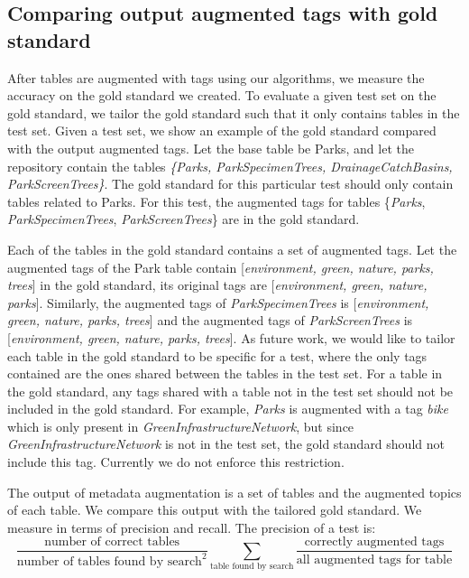 \subsection{Comparing output augmented tags with gold standard}
\label{ssec:ComparingOutputAugmentedTagsWithGoldStandard}

After tables are augmented with tags using our algorithms, we measure the accuracy on the gold standard we created. To evaluate a given test set on the gold standard, we tailor the gold standard such that it only contains tables in the test set. Given a test set, we show an example of the gold standard compared with the output augmented tags. Let the base table be Parks, and let the repository contain the tables  \textit{\{Parks, ParkSpecimenTrees, DrainageCatchBasins, ParkScreenTrees\}}. The gold standard for this particular test should only contain tables related to Parks. For this test, the augmented tags for tables \{\textit{Parks}, \textit{ParkSpecimenTrees}, \textit{ParkScreenTrees}\} are in the gold standard.

Each of the tables in the gold standard contains a set of augmented tags. Let the augmented tags of the Park table contain [\textit{environment, green, nature, parks, trees}] in the gold standard, its original tags are [\textit{environment, green, nature, parks}]. Similarly, the augmented tags of \textit{ParkSpecimenTrees} is [\textit{environment, green, nature, parks, trees}] and the augmented tags of \textit{ParkScreenTrees} is [\textit{environment, green, nature, parks, trees}]. As future work, we would like to tailor each table in the gold standard to be specific for a test, where the only tags contained are the ones shared between the tables in the test set. For a table in the gold standard, any tags shared with a table not in the test set should not be included in the gold standard. For example, \textit{Parks} is augmented with a tag \textit{bike} which is only present in \textit{GreenInfrastructureNetwork}, but since \textit{GreenInfrastructureNetwork} is not in the test set, the gold standard should not include this tag. Currently we do not enforce this restriction.

The output of metadata augmentation is a set of tables and the augmented topics of each table. We compare this output with the tailored gold standard. We measure in terms of precision and recall. The precision of a test is:
\[
\frac{\text{number of correct tables}}{\text{number of tables found by search}^{2}}\sum\limits _{\text{table found by search}}\frac{\text{correctly augmented tags}}{\text{all augmented tags for table}}
\]

